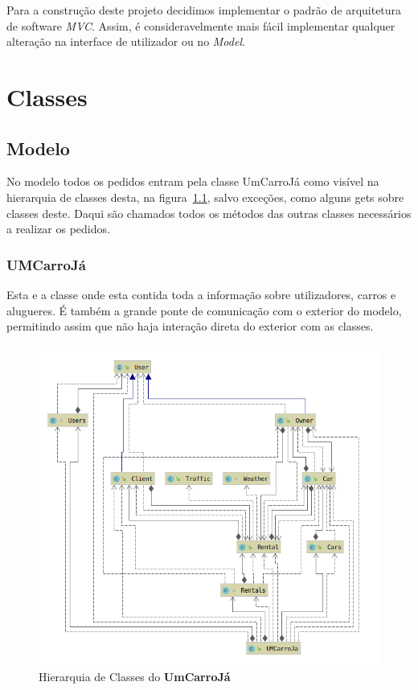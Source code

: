 \documentclass[a4paper]{report}
\begin{document}
Para a construção deste projeto decidimos implementar o padrão de arquitetura de software \textit{MVC}.
Assim, é consideravelmente mais fácil implementar qualquer alteração na interface de utilizador ou no \textit{Model}.

\chapter{Classes}\label{chap:api}

\section{Modelo}

No modelo todos os pedidos entram pela classe UmCarroJá como visível na hierarquia de classes desta,
na figura~\ref{fig:hUCJ}, salvo exceções, como alguns gets sobre classes deste. Daqui são chamados
todos os métodos das outras classes necessários a realizar os pedidos.

\subsection{UMCarroJá}

Esta e a classe onde esta contida toda a informação sobre utilizadores,
carros e alugueres. É também a grande ponte de comunicação com o exterior
do modelo, permitindo assim que não haja interação direta do exterior com
as classes.

\begin{figure}[h]
    \centering
    \includegraphics[scale=0.5]{hierarquiaUmCarroJa.png}
    \caption{Hierarquia de Classes do \textbf{UmCarroJá}}\label{fig:hUCJ}
\end{figure}
\end{document}
